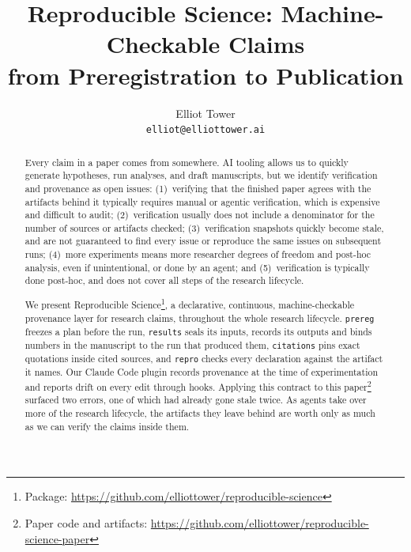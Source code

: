 \documentclass{article}
\title{Reproducible Science: Machine-Checkable Claims\\from Preregistration to Publication}
\author{Elliot Tower\\\texttt{elliot@elliottower.ai}}
\date{}
\newcommand{\code}[1]{\texttt{#1}}
\newcommand{\prereg}{\code{prereg}}
\newcommand{\results}{\code{results}}
\newcommand{\citations}{\code{citations}}
\newcommand{\repro}{\code{repro}}
\begin{document}
\maketitle

\begin{abstract}
Every claim in a paper comes from somewhere. AI tooling allows us to quickly generate hypotheses,
run analyses, and draft manuscripts, but we identify verification and provenance as open issues:
(1)~verifying that the finished paper agrees with the artifacts behind it typically requires
manual or agentic verification, which is expensive and difficult to audit; (2)~verification
usually does not include a denominator for the number of sources or artifacts checked;
(3)~verification snapshots quickly become stale, and are not guaranteed to find every issue or
reproduce the same issues on subsequent runs; (4)~more experiments means more researcher degrees
of freedom and post-hoc analysis, even if unintentional, or done by an agent; and
(5)~verification is typically done post-hoc, and does not cover all steps of the research
lifecycle.

We present Reproducible Science\footnote{Package: \url{https://github.com/elliottower/reproducible-science}}, a declarative, continuous, machine-checkable provenance layer
for research claims, throughout the whole research lifecycle. \prereg{} freezes a plan before the
run, \results{} seals its inputs, records its outputs and binds numbers in the manuscript to the run
that produced them, \citations{} pins exact quotations inside cited sources, and \repro{} checks
every declaration against the artifact it names. Our Claude Code plugin records provenance at the
time of experimentation and reports drift on every edit through hooks. Applying this contract to
this paper\footnote{Paper code and artifacts: \url{https://github.com/elliottower/reproducible-science-paper}} surfaced two errors, one of which had already gone stale twice. As agents take over more
of the research lifecycle, the artifacts they leave behind are worth only as much as we can verify
the claims inside them.
\end{abstract}
\end{document}
